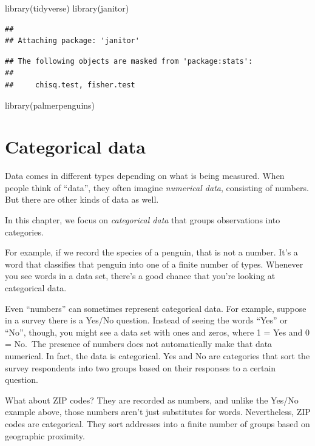 \documentclass[
]{book}
\newenvironment{Shaded}{\begin{snugshade}}{\end{snugshade}}
\newcommand{\FunctionTok}[1]{\textcolor[rgb]{0.00,0.00,0.00}{#1}}
\newcommand{\NormalTok}[1]{#1}
\begin{document}
\begin{Shaded}
\begin{Highlighting}[]
\FunctionTok{library}\NormalTok{(tidyverse)}
\FunctionTok{library}\NormalTok{(janitor)}
\end{Highlighting}
\end{Shaded}

\begin{verbatim}
## 
## Attaching package: 'janitor'
\end{verbatim}

\begin{verbatim}
## The following objects are masked from 'package:stats':
## 
##     chisq.test, fisher.test
\end{verbatim}

\begin{Shaded}
\begin{Highlighting}[]
\FunctionTok{library}\NormalTok{(palmerpenguins)}
\end{Highlighting}
\end{Shaded}

\hypertarget{categorical-data}{%
\section{Categorical data}\label{categorical-data}}

Data comes in different types depending on what is being measured. When people think of ``data'', they often imagine \emph{numerical data}, consisting of numbers. But there are other kinds of data as well.

In this chapter, we focus on \emph{categorical data} that groups observations into categories.

For example, if we record the species of a penguin, that is not a number. It's a word that classifies that penguin into one of a finite number of types. Whenever you see words in a data set, there's a good chance that you're looking at categorical data.

Even ``numbers'' can sometimes represent categorical data. For example, suppose in a survey there is a Yes/No question. Instead of seeing the words ``Yes'' or ``No'', though, you might see a data set with ones and zeros, where 1 = Yes and 0 = No.~The presence of numbers does not automatically make that data numerical. In fact, the data is categorical. Yes and No are categories that sort the survey respondents into two groups based on their responses to a certain question.

What about ZIP codes? They are recorded as numbers, and unlike the Yes/No example above, those numbers aren't just substitutes for words. Nevertheless, ZIP codes are categorical. They sort addresses into a finite number of groups based on geographic proximity.
\end{document}
